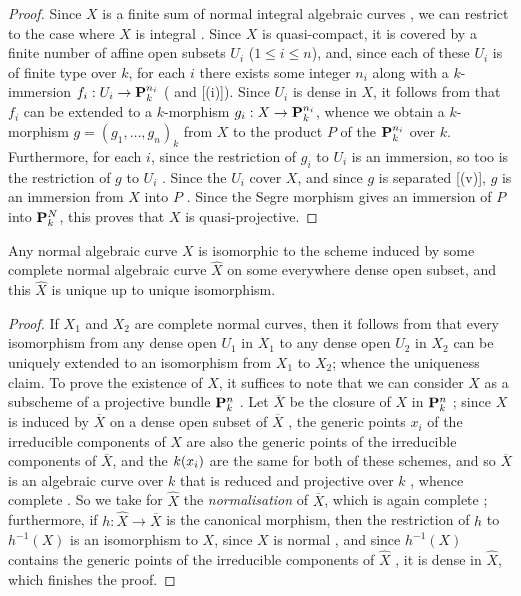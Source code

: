 \begin{proof}
Since $X$ is a finite sum of normal integral algebraic curves , we can restrict to the case where $X$ is integral .
Since $X$ is quasi-compact, it is covered by a finite number of affine open subsets $U_i$ ($1\leq i\leq n$), and, since each of these $U_i$ is of finite type over $k$, for each $i$ there exists some integer $n_i$ along with a $k$-immersion $f_i:U_i\to\bb{P}_k^{n_i}$ ( and [(i)]).
Since $U_i$ is dense in $X$, it follows from  that $f_i$ can be extended to a $k$-morphism $g_i:X\to\bb{P}_k^{n_i}$, whence we obtain a $k$-morphism $g=(g_1,\ldots,g_n)_k$ from $X$ to the product $P$ of the $\mathbf{P}_k^{n_i}$ over $k$.
Furthermore, for each $i$, since the restriction of $g_i$ to $U_i$ is an immersion, so too is the restriction of $g$ to $U_i$ .
Since the $U_i$ cover $X$, and since $g$ is separated [(v)], $g$ is an immersion from $X$ into $P$ .
Since the Segre morphism  gives an immersion of $P$ into $\mathbf{P}_k^N$, this proves that $X$ is quasi-projective.
\end{proof}

\begin{corollary}[7.4.11]
\label{II.7.4.11}
Any normal algebraic curve $X$ is isomorphic to the scheme induced by some complete normal algebraic curve $\hat{X}$ on some everywhere dense open subset, and this $\hat{X}$ is unique up to unique isomorphism.
\end{corollary}

\begin{proof}
If $X_1$ and $X_2$ are complete normal curves, then it follows from  that every isomorphism from any dense open $U_1$ in $X_1$ to any dense open $U_2$ in $X_2$ can be uniquely extended to an isomorphism from $X_1$ to $X_2$;
whence the uniqueness claim.
To prove the existence of $\hat{X}$, it suffices to note that we can consider $X$ as a subscheme of a projective bundle $\mathbf{P}_k^n$ .
Let $\overline{X}$ be the closure of $X$ in $\mathbf{P}_k^n$ ;
since $X$ is induced by $\overline{X}$ on a dense open subset of $\overline{X}$ , the generic points $x_i$ of the irreducible components of $X$ are also the generic points of the irreducible components of $\overline{X}$, and the $k(x_i)$ are the same for both of these schemes, and so  $\overline{X}$ is an algebraic curve over $k$ that is reduced  and projective over $k$ , whence complete .
So we take for $\hat{X}$ the \emph{normalisation} of $\overline{X}$, which is again complete ;
furthermore, if $h:\hat{X}\to\overline{X}$ is the canonical morphism, then the restriction of $h$ to $h^{-1}(X)$ is an isomorphism to $X$, since $X$ is normal , and since $h^{-1}(X)$ contains the generic points of the irreducible components of $\hat{X}$ , it is dense in $\hat{X}$, which finishes the proof.
\end{proof}

